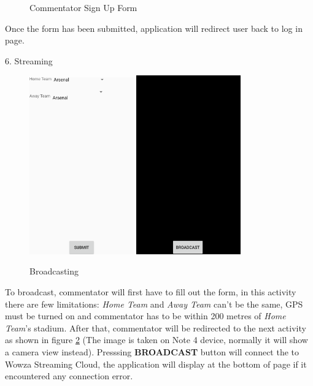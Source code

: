 \documentclass{article}
\begin{document}
\begin{flushleft}
\begin{figure}[H]
	\caption{Commentator Sign Up Form}
	\label{fig:signup}
\end{figure}
Once the form has been submitted, application will redirect user back to log in page.\par
{\large 6. Streaming}\par
\begin{figure}[H]
	\includegraphics[width=0.40\textwidth]{matchmaking}
	\hfill
	\includegraphics[width=0.40\textwidth]{broadcast}
	\caption{Broadcasting}
	\label{fig:broadcast}
\end{figure}
To broadcast, commentator will first have to fill out the form, in this activity there are few limitations: \textit{Home Team} and \textit{Away Team} can't be the same, GPS must be turned on and commentator has to be within 200 metres of \textit{Home Team}'s stadium. After that, commentator will be redirected to the next activity as shown in figure \ref{fig:broadcast} (The image is taken on Note 4 device, normally it will show a camera view instead). Presssing \textbf{BROADCAST} button will connect the to Wowza Streaming Cloud, the application will display at the bottom of page if it encountered any connection error.\par

\end{flushleft}
\end{document}
